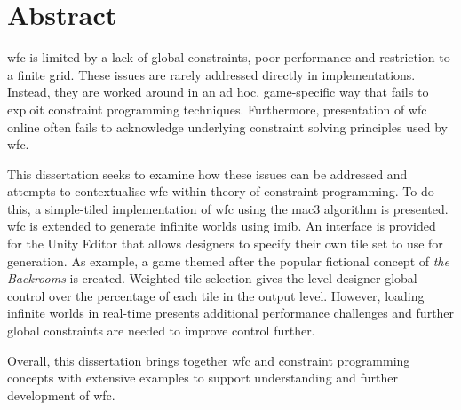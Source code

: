 \section*{Abstract}
\acrfull{wfc} is limited by a lack of global constraints, poor performance and restriction to a finite grid. These issues are rarely addressed directly in implementations. Instead, they are worked around in an ad hoc, game-specific way that fails to exploit constraint programming techniques. Furthermore, presentation of \acrshort{wfc} online often fails to acknowledge underlying constraint solving principles used by \acrshort{wfc}.

This dissertation seeks to examine how these issues can be addressed and attempts to contextualise \acrshort{wfc} within theory of constraint programming. To do this, a simple-tiled implementation of \acrshort{wfc} using the \acrfull{mac3} algorithm is presented. \acrshort{wfc} is extended to generate infinite worlds using \acrfull{imib}. An interface is provided for the Unity Editor that allows designers to specify their own tile set to use for generation. As example, a game themed after the popular fictional concept of \textit{the Backrooms} is created. Weighted tile selection gives the level designer global control over the percentage of each tile in the output level. However, loading infinite worlds in real-time presents additional performance challenges and further global constraints are needed to improve control further.

Overall, this dissertation brings together \acrshort{wfc} and constraint programming concepts with extensive examples to support understanding and further development of \acrshort{wfc}.


